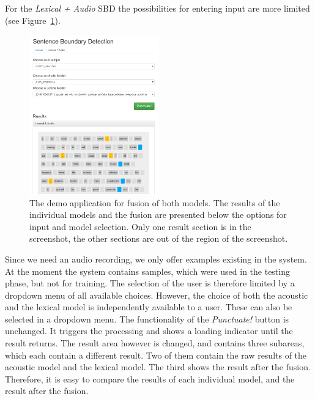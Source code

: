 For the \emph{Lexical + Audio} SBD the possibilities for entering input are more limited (see Figure~\ref{fig:demo_la}).
\begin{figure}[ht]
    \centering
    \includegraphics[width=0.5\textwidth]{img/demo_l_a.png}
    \caption{The demo application for fusion of both models. The results of the individual models and the fusion are presented below the options for input and model selection. Only one result section is in the screenshot, the other sections are out of the region of the screenshot.}
    \label{fig:demo_la}
\end{figure}
Since we need an audio recording, we only offer examples existing in the system.
At the moment the system contains samples, which were used in the testing phase, but not for training.
The selection of the user is therefore limited by a dropdown menu of all available choices.
However, the choice of both the acoustic and the lexical model is independently available to a user.
These can also be selected in a dropdown menu.
The functionality of the \emph{Punctuate!} button is unchanged.
It triggers the processing and shows a loading indicator until the result returns.
The result area however is changed, and contains three subareas, which each contain a different result.
Two of them contain the raw results of the acoustic model and the lexical model.
The third shows the result after the fusion.
Therefore, it is easy to compare the results of each individual model, and the result after the fusion.
